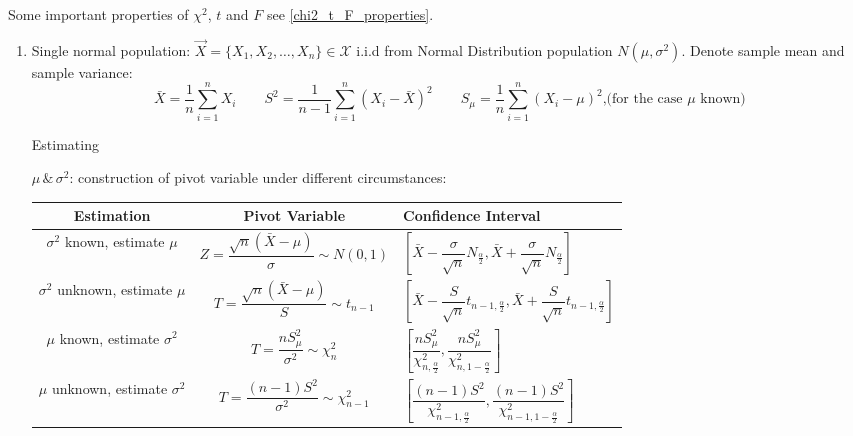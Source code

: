     Some important properties of $\chi^2$, $t$ and $F$ see \autoref{chi2_t_F_properties}.
    \begin{enumerate}
        \item Single normal population: $\vec{X}=\{X_1,X_2,\ldots,X_n\}\in\mathscr{X}$ i.i.d from Normal Distribution population $N(\mu,\sigma^2)$. Denote sample mean and sample variance: 
        \begin{equation}\bar{X}=\frac{1}{n}\sum_{i=1}^nX_i\qquad S^2=\frac{1}{n-1}\sum_{i=1}^n(X_i-\bar{X})^2\qquad S_\mu=\dfrac{1}{n}\sum_{i=1}^n(X_i-\mu)^2\text{,(for the case }\mu\text{ known)}\end{equation}

        \hypertarget{OneSampletTest}{Estimating} $\mu\,\&\,\sigma^2$: construction of pivot variable under different circumstances:
  

        \begin{table}[htbp]
            \centering
            \renewcommand\arraystretch{1.9}
            \begin{tabularx}{\linewidth}{|c|c|Y|}
                \hline 
                Estimation& Pivot Variable & Confidence Interval\\
                \hline
                $\sigma^2$ known, estimate $\mu$    &   $Z=\dfrac{\sqrt{n}(\bar{X}-\mu)}{\sigma}\sim N(0,1)$ & $\left[ \bar{X}-\dfrac{\sigma}{\sqrt{n}}N_\frac{\alpha}{2},\bar{X}+\dfrac{\sigma}{\sqrt{n}}N_\frac{\alpha}{2} \right]$\\
                \hline
                $\sigma^2$ unknown, estimate $\mu$&$T=\dfrac{\sqrt{n}(\bar{X}-\mu)}{S}\sim t_{n-1}$&$\left[\bar{X}-\dfrac{S}{\sqrt{n}}t_{n-1,\frac{\alpha}{2}},\bar{X}+\dfrac{S}{\sqrt{n}}t_{n-1,\frac{\alpha}{2}}\right]$\\
                \hline
                $\mu$ known, estimate $\sigma^2$&$T=\dfrac{nS_\mu^2}{\sigma^2}\sim\chi_n^2$&$\left[\dfrac{nS^2_\mu}{\chi^2_{n,\frac{\alpha}{2}}},\dfrac{nS^2_\mu}{\chi^2_{n,1-\frac{\alpha}{2}}}\right]$\\
                \hline
                $\mu$ unknown, estimate $\sigma^2$&$T=\dfrac{(n-1)S^2}{\sigma^2}\sim\chi^2_{n-1} $&$\left[\dfrac{(n-1)S^2}{\chi^2_{n-1,\frac{\alpha}{2}}},\dfrac{(n-1)S^2}{\chi^2_{n-1,1-\frac{\alpha}{2}}}\right]$\\
                \hline
            \end{tabularx}
        \end{table}


\end{enumerate}
